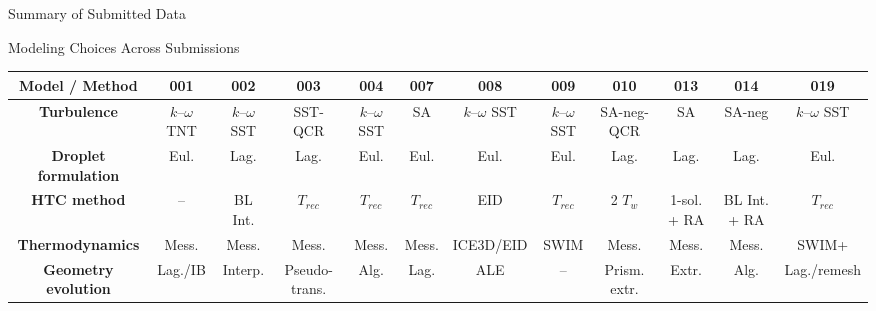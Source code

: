 \begin{frame}{\small  Summary of Submitted Data}


\end{frame}



\begin{frame}{\small Modeling Choices Across Submissions}
\scriptsize

\centering


{\tiny
\renewcommand{\arraystretch}{1.45}
\setlength{\tabcolsep}{1.65pt}

\begin{tabular}{c|ccccccccccc}
\toprule
\textbf{Model / Method}
& \textbf{001}
& \textbf{002}
& \textbf{003}
& \textbf{004}
& \textbf{007}
& \textbf{008}
& \textbf{009}
& \textbf{010}
& \textbf{013}
& \textbf{014}
& \textbf{019} \\
\midrule

\textbf{Turbulence}
& $k$--$\omega$ TNT
& $k$--$\omega$ SST
& SST-QCR
& $k$--$\omega$ SST
& SA
& $k$--$\omega$ SST
& $k$--$\omega$ SST
& SA-neg-QCR
& SA
& SA-neg
& $k$--$\omega$ SST \\

\textbf{Droplet formulation}
& Eul.
& Lag.
& Lag.
& Eul.
& Eul.
& Eul.
& Eul.
& Lag.
& Lag.
& Lag.
& Eul. \\

\textbf{HTC method}
& --
& BL Int.
& $T_{rec}$
& $T_{rec}$
& $T_{rec}$
& EID
& $T_{rec}$
& 2 $T_w$
& 1-sol. + RA
& BL Int. + RA
& $T_{rec}$ \\

\textbf{Thermodynamics}
& Mess.
& Mess.
& Mess.
& Mess.
& Mess.
& ICE3D/EID
& SWIM
& Mess.
& Mess.
& Mess.
& SWIM+ \\

\textbf{Geometry evolution}
& Lag./IB
& Interp.
& Pseudo-trans.
& Alg.
& Lag.
& ALE
& --
& Prism. extr.
& Extr.
& Alg.
& Lag./remesh \\

\bottomrule
\end{tabular}
}


\end{frame}
